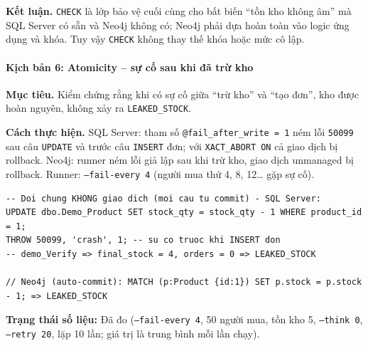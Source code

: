 \textbf{Kết luận.} \texttt{CHECK} là lớp bảo vệ cuối cùng cho bất biến ``tồn kho không âm'' mà SQL Server có sẵn và Neo4j không có; Neo4j phải dựa hoàn toàn vào logic ứng dụng và khóa. Tuy vậy \texttt{CHECK} không thay thế khóa hoặc mức cô lập.

\paragraph{Kịch bản 6: Atomicity -- sự cố sau khi đã trừ kho}
\label{par:tx-kb6}\mbox{}

\textbf{Mục tiêu.} Kiểm chứng rằng khi có sự cố giữa ``trừ kho'' và ``tạo đơn'', kho được hoàn nguyên, không xảy ra \texttt{LEAKED\_STOCK}.

\textbf{Cách thực hiện.} SQL Server: tham số \texttt{@fail\_after\_write = 1} ném lỗi \texttt{50099} sau câu \texttt{UPDATE} và trước câu \texttt{INSERT} đơn; với \texttt{XACT\_ABORT ON} cả giao dịch bị rollback. Neo4j: runner ném lỗi giả lập sau khi trừ kho, giao dịch unmanaged bị rollback. Runner: \texttt{--fail-every 4} (người mua thứ 4, 8, 12\ldots{} gặp sự cố).

\begin{lstlisting}[basicstyle=\ttfamily\small, breaklines=true, frame=single]
-- Doi chung KHONG giao dich (moi cau tu commit) - SQL Server:
UPDATE dbo.Demo_Product SET stock_qty = stock_qty - 1 WHERE product_id = 1;
THROW 50099, 'crash', 1; -- su co truoc khi INSERT don
-- demo_Verify => final_stock = 4, orders = 0 => LEAKED_STOCK

// Neo4j (auto-commit): MATCH (p:Product {id:1}) SET p.stock = p.stock - 1; => LEAKED_STOCK
\end{lstlisting}

\textbf{Trạng thái số liệu:} Đã đo (\texttt{--fail-every 4}, 50 người mua, tồn kho 5, \texttt{--think 0}, \texttt{--retry 20}, lặp 10 lần; giá trị là trung bình mỗi lần chạy).

